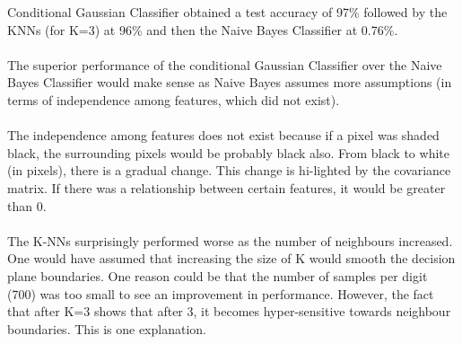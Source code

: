 \documentclass[10pt]{article}
\begin{document}
Conditional Gaussian Classifier obtained a test accuracy of 97\% followed by the KNNs (for K=3) at 96\% and then the Naive Bayes Classifier at 0.76\%.
\\ \\
The superior performance of the conditional Gaussian Classifier over the Naive Bayes Classifier would make sense as Naive Bayes assumes more assumptions (in terms of independence among features, which did not exist).
\\ \\
The independence among features does not exist because if a pixel was shaded black, the surrounding pixels would be probably black also. From black to white (in pixels), there is a gradual change. This change is hi-lighted by the covariance matrix. If there was a relationship between certain features, it would be greater than 0. 
\\ \\
The K-NNs surprisingly performed worse as the number of neighbours increased. One would have assumed that increasing the size of K would smooth the decision plane boundaries. One reason could be that the number of samples per digit (700) was too small to see an improvement in performance. However, the fact that after K=3 shows that after 3, it becomes hyper-sensitive towards neighbour boundaries. This is one explanation.






\pagebreak
\end{document}
